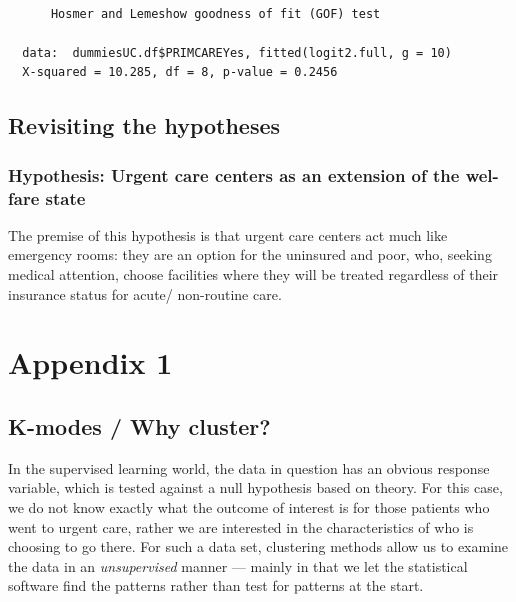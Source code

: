 \documentclass[12pt,twoside]{reedthesis}
\begin{document}
  \begin{verbatim}
  
      Hosmer and Lemeshow goodness of fit (GOF) test
  
  data:  dummiesUC.df$PRIMCAREYes, fitted(logit2.full, g = 10)
  X-squared = 10.285, df = 8, p-value = 0.2456
  \end{verbatim}
  
  \section*{Revisiting the hypotheses}\label{revisiting-the-hypotheses}
  
  \subsection{Hypothesis: Urgent care centers as an extension of the
  wel-fare
  state}\label{hypothesis-urgent-care-centers-as-an-extension-of-the-wel-fare-state}
  
  The premise of this hypothesis is that urgent care centers act much like
  emergency rooms: they are an option for the uninsured and poor, who,
  seeking medical attention, choose facilities where they will be treated
  regardless of their insurance status for acute/ non-routine care.
  
  \chapter*{Appendix 1}\label{appendix-1}
  
  \onehalfspacing
  
  \section*{K-modes / Why cluster?}\label{k-modes-why-cluster}
  
  In the supervised learning world, the data in question has an obvious
  response variable, which is tested against a null hypothesis based on
  theory. For this case, we do not know exactly what the outcome of
  interest is for those patients who went to urgent care, rather we are
  interested in the characteristics of who is choosing to go there. For
  such a data set, clustering methods allow us to examine the data in an
  \emph{unsupervised} manner --- mainly in that we let the statistical
  software find the patterns rather than test for patterns at the start.
  
\end{document}

